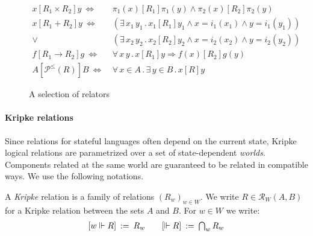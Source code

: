 \documentclass[sigplan,screen,review]{acmart}
\newcommand{\figsize}{\small}
\newcommand{\ifr}[1]{\mathrel{[{#1}]}}
\begin{document}
\begin{figure} %
  \figsize
  \begin{align*}
    x \ifr{R_1 \times R_2} y \ \Leftrightarrow\  &
      \pi_1(x) \ifr{R_1} \pi_1(y) \wedge
      \pi_2(x) \ifr{R_2} \pi_2(y) \\
    x \ifr{R_1 + R_2} y \ \Leftrightarrow\  &
      (\exists \, x_1 \, y_1 \,.\,
        x_1 \ifr{R_1} y_1 \wedge
        x = i_1(x_1) \wedge
        y = i_1(y_1)) \\ \vee\ &
      (\exists \, x_2 \, y_2 \,.\,
        x_2 \ifr{R_2} y_2 \wedge
        x = i_2(x_2) \wedge
        y = i_2(y_2)) \\
    f \ifr{R_1 \rightarrow R_2} g \ \Leftrightarrow\  &
      \forall \, x \, y \,.\,
        x \ifr{R_1} y \Rightarrow
        f(x) \ifr{R_2} g(y) \\
    A \ifr{\mathcal{P}^\le(R)} B \ \Leftrightarrow\  &
      \forall \, x \in A \,.\,
      \exists \, y \in B \,.\,
      x \ifr{R} y
  \end{align*}
  \caption{A selection of relators}
  \label{fig:relators}
\end{figure}


\paragraph{Kripke relations} %

Since relations for stateful languages
often depend on the current state,
Kripke logical relations
are parametrized over a set of state-dependent \emph{worlds}.
Components related at the same world
are guaranteed to be related in compatible ways.
We use the following notations.

\begin{definition} \label{def:klr} %
A \emph{Kripke} relation is
a family of relations $(R_w)_{w \in W}$.
We write $R \in \mathcal{R}_W(A, B)$
for a Kripke relation between the sets $A$ and $B$.
For $w \in W$ we write:
\[
\begin{array}{c@{\qquad}c}
    [w \Vdash R] \: := \: R_w &
    [\Vdash R] \: := \: \bigcap_{w} R_w
\end{array}
\]
\end{definition}
\end{document}
